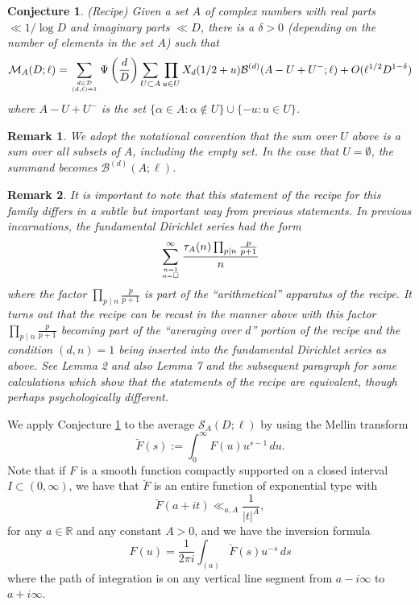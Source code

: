 \documentclass[12pt]{amsart}
\newtheorem{conjecture}{Conjecture}
\newtheorem{remark}{Remark}
\begin{document}
	\begin{conjecture}(Recipe)
		\label{conj: recipe}
		Given a set $A$ of complex numbers with real parts $\ll 1/\log D$ and imaginary parts $\ll D$, there is a $\delta>0$ (depending on the number of elements in the set $A$) such that 
		\begin{eqnarray*}
			\mathcal M_A(D;\ell)= \sum_{d\in \mathcal D\atop (d,\ell)=1} \Psi\left(\frac dD\right) \sum_{U\subset A} \prod_{u\in U} X_d(1/2 +u) \mathcal B^{(d)}(A-U+U^-;\ell)+O(\ell^{1/2}D^{1-\delta})
		\end{eqnarray*}
		where $A-U+U^-$ is the set $\{\alpha\in A: \alpha\notin U\}\cup \{ -u:u\in U\}$.
	\end{conjecture}
	
	\begin{remark}
	We adopt the notational convention that the sum over $U$ above is a sum over all subsets of $A$, including the empty set. In the case that $U = \emptyset$, the summand becomes $\mathcal B^{(d)}(A;\ell)$. 
	\end{remark}
	
	\begin{remark}
		It is important to note that this statement of the recipe for this family differs in a subtle but important way from previous statements. In previous incarnations,
		the fundamental Dirichlet series had the form
		$$ \sum_{n=1\atop n=\square}^\infty \frac{\tau_A(n) \prod_{p\mid n} \frac{p}{p+1}} {n}$$
		where the factor $\prod_{p\mid n}\frac {p}{p+1}$ is part of the ``arithmetical'' apparatus of the recipe. It turns out that the recipe can be recast in the manner above with this factor $\prod_{p\mid n} \frac{p}{p+1}$  becoming part of the ``averaging over $d$'' portion of the recipe  and the condition $(d,n)=1$
		being inserted into the fundamental Dirichlet series as above.  See Lemma 2 and also Lemma 7 and the subsequent paragraph for some calculations which show that the statements
		of the recipe  are equivalent, though perhaps psychologically different. 
	\end{remark}
	
	We apply Conjecture \ref{conj: recipe} to the average $\mathcal{S}_A(D;\ell)$ by using the Mellin transform
	$$
	\breve{F}(s):= \int_0^\infty F(u) u^{s-1}\, du.
	$$
	Note that if $F$ is a smooth function compactly supported on a closed interval $I \subset (0,\infty)$, we have that $\breve{F}$ is an entire function of exponential type with
	$$
	\breve{F}(a+it) \ll_{a,A} \frac{1}{|t|^A},
	$$
	for any $a\in \mathbb{R}$ and any constant $A > 0$, and we have the inversion formula
	$$
	F(u) = \frac{1}{2\pi i} \int_{(a)} \breve{F}(s) u^{-s}\, ds
	$$
	where the path of integration is on any vertical line segment from $a-i\infty$ to $a + i\infty$.
	
\end{document}
